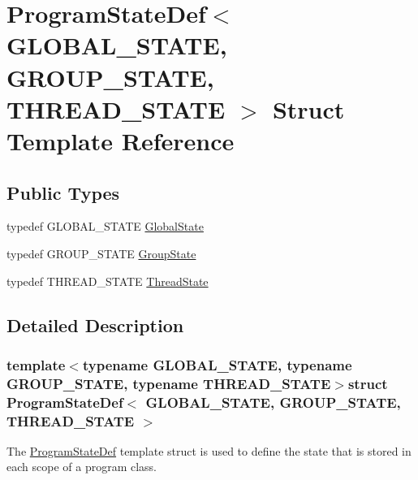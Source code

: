 \hypertarget{structProgramStateDef}{\section{Program\-State\-Def$<$ G\-L\-O\-B\-A\-L\-\_\-\-S\-T\-A\-T\-E, G\-R\-O\-U\-P\-\_\-\-S\-T\-A\-T\-E, T\-H\-R\-E\-A\-D\-\_\-\-S\-T\-A\-T\-E $>$ Struct Template Reference}
\label{structProgramStateDef}
}
\subsection*{Public Types}
\begin{DoxyCompactItemize}
\item 
typedef G\-L\-O\-B\-A\-L\-\_\-\-S\-T\-A\-T\-E \hyperlink{structProgramStateDef_a8f9d3005b6690c9ed965e42d5c5bb21f}{Global\-State}
\item 
typedef G\-R\-O\-U\-P\-\_\-\-S\-T\-A\-T\-E \hyperlink{structProgramStateDef_aa781f95a1fadd73f9a9fc4acbff8c318}{Group\-State}
\item 
typedef T\-H\-R\-E\-A\-D\-\_\-\-S\-T\-A\-T\-E \hyperlink{structProgramStateDef_aaa5eb80e26181e84845c4aefd5819ee6}{Thread\-State}
\end{DoxyCompactItemize}


\subsection{Detailed Description}
\subsubsection*{template$<$typename G\-L\-O\-B\-A\-L\-\_\-\-S\-T\-A\-T\-E, typename G\-R\-O\-U\-P\-\_\-\-S\-T\-A\-T\-E, typename T\-H\-R\-E\-A\-D\-\_\-\-S\-T\-A\-T\-E$>$struct Program\-State\-Def$<$ G\-L\-O\-B\-A\-L\-\_\-\-S\-T\-A\-T\-E, G\-R\-O\-U\-P\-\_\-\-S\-T\-A\-T\-E, T\-H\-R\-E\-A\-D\-\_\-\-S\-T\-A\-T\-E $>$}

The {\ttfamily \hyperlink{structProgramStateDef}{Program\-State\-Def}} template struct is used to define the state that is stored in each scope of a program class. 


